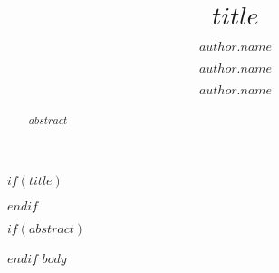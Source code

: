 \documentclass[11pt, a4paper]{article}
\date{}
\title{$title$}
\author[$author.affilnumber$*]{$author.name$}
\author[$author.affilnumber$]{$author.name$}
\author{$author.name$}
\affil[$affil.number$]{$affil.name$}
\affil[*]{\corresponding}
\begin{document}
	$if(title)$
	\maketitle
	$endif$

	$if(abstract)$
	\begin{abstract}
		\noindent
		$abstract$
	\end{abstract}
	$endif$
	\setlength\parindent{.5cm}
	$body$
\end{document}

